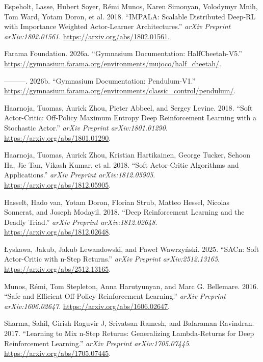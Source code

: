 \documentclass[
  american,
]{article}
\newlength{\cslhangindent}
\newenvironment{CSLReferences}[2] %
 {\begin{list}{}{%
  \setlength{\itemindent}{0pt}
  \setlength{\leftmargin}{0pt}
  \setlength{\parsep}{0pt}
  \ifodd #1
   \setlength{\leftmargin}{\cslhangindent}
   \setlength{\itemindent}{-1\cslhangindent}
  \fi
  \setlength{\itemsep}{#2\baselineskip}}}
 {\end{list}}
\begin{document}
\protect{}\label{refs}
\begin{CSLReferences}{1}{0}
Espeholt, Lasse, Hubert Soyer, Rémi Munos, Karen Simonyan, Volodymyr
Mnih, Tom Ward, Yotam Doron, et al. 2018. {``IMPALA: Scalable
Distributed Deep-RL with Importance Weighted Actor-Learner
Architectures.''} \emph{arXiv Preprint arXiv:1802.01561}.
\url{https://arxiv.org/abs/1802.01561}.

Farama Foundation. 2026a. {``Gymnasium Documentation: HalfCheetah-V5.''}
\url{https://gymnasium.farama.org/environments/mujoco/half_cheetah/}.

---------. 2026b. {``Gymnasium Documentation: Pendulum-V1.''}
\url{https://gymnasium.farama.org/environments/classic_control/pendulum/}.

Haarnoja, Tuomas, Aurick Zhou, Pieter Abbeel, and Sergey Levine. 2018.
{``Soft Actor-Critic: Off-Policy Maximum Entropy Deep Reinforcement
Learning with a Stochastic Actor.''} \emph{arXiv Preprint
arXiv:1801.01290}. \url{https://arxiv.org/abs/1801.01290}.

Haarnoja, Tuomas, Aurick Zhou, Kristian Hartikainen, George Tucker,
Sehoon Ha, Jie Tan, Vikash Kumar, et al. 2018. {``Soft Actor-Critic
Algorithms and Applications.''} \emph{arXiv Preprint arXiv:1812.05905}.
\url{https://arxiv.org/abs/1812.05905}.

Hasselt, Hado van, Yotam Doron, Florian Strub, Matteo Hessel, Nicolas
Sonnerat, and Joseph Modayil. 2018. {``Deep Reinforcement Learning and
the Deadly Triad.''} \emph{arXiv Preprint arXiv:1812.02648}.
\url{https://arxiv.org/abs/1812.02648}.

Łyskawa, Jakub, Jakub Lewandowski, and Paweł Wawrzyński. 2025. {``SACn:
Soft Actor-Critic with n-Step Returns.''} \emph{arXiv Preprint
arXiv:2512.13165}. \url{https://arxiv.org/abs/2512.13165}.

Munos, Rémi, Tom Stepleton, Anna Harutyunyan, and Marc G. Bellemare.
2016. {``Safe and Efficient Off-Policy Reinforcement Learning.''}
\emph{arXiv Preprint arXiv:1606.02647}.
\url{https://arxiv.org/abs/1606.02647}.

Sharma, Sahil, Girish Raguvir J, Srivatsan Ramesh, and Balaraman
Ravindran. 2017. {``Learning to Mix n-Step Returns: Generalizing
Lambda-Returns for Deep Reinforcement Learning.''} \emph{arXiv Preprint
arXiv:1705.07445}. \url{https://arxiv.org/abs/1705.07445}.


\end{CSLReferences}
\end{document}
